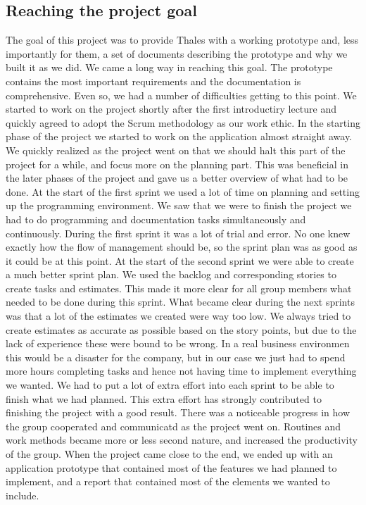 \subsection{Reaching the project goal}
The goal of this project was to provide Thales with a working prototype and, less importantly for them, a set of documents describing the prototype and why we built it as we did. We came a long way in reaching this goal. The prototype contains the most important requirements and the documentation is comprehensive. Even so, we had a number of difficulties getting to this point.
\newline
\newline
We started to work on the project shortly after the first introductiry lecture and quickly agreed to adopt the Scrum methodology as our work ethic. In the starting phase of the project we started to work on the application almost straight away. We quickly realized as the project went on that we should halt this part of the project for a while, and focus more on the planning part. This was beneficial in the later phases of the project and gave us a better overview of what had to be done.
\newline
\newline
At the start of the first sprint we used a lot of time on planning and setting up the programming environment. We saw that we were to finish the project we had to do programming and documentation tasks simultaneously and continuously. During the first sprint it was a lot of trial and error. No one knew exactly how the flow of management should be, so the sprint plan was as good as it could be at this point.
\newline
\newline
At the start of the second sprint we were able to create a much better sprint plan. We used the backlog and corresponding stories to create tasks and estimates. This made it more clear for all group members what needed to be done during this sprint. 
\newline
\newline
What became clear during the next sprints was that a lot of the estimates we created were way too low. We always tried to create estimates as accurate as possible based on the story points, but due to the lack of experience these were bound to be wrong. In a real business environmen this would be a disaster for the company, but in our case we just had to spend more hours completing tasks and hence not having time to implement everything we wanted. We had to put a lot of extra effort into each sprint to be able to finish what we had planned. This extra effort has strongly contributed to finishing the project with a good result.
\newline
\newline
There was a noticeable progress in how the group cooperated and communicatd as the project went on. Routines and work methods became more or less second nature, and increased the productivity of the group. When the project came close to the end, we ended up with an application prototype that contained most of the features we had planned to implement, and a report that contained most of the elements we wanted to include.

